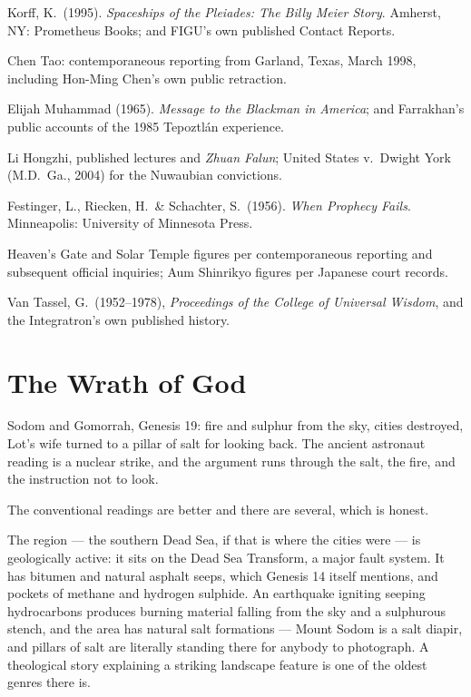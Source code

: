 \begin{srcnotes}
\item Korff, K.\ (1995). \emph{Spaceships of the Pleiades: The Billy Meier Story}. Amherst, NY:
Prometheus Books; and FIGU's own published Contact Reports.
\item Chen Tao: contemporaneous reporting from Garland, Texas, March 1998, including Hon-Ming
Chen's own public retraction.
\item Elijah Muhammad (1965). \emph{Message to the Blackman in America}; and Farrakhan's public
accounts of the 1985 Tepoztl\'an experience.
\item Li Hongzhi, published lectures and \emph{Zhuan Falun}; United States v.\ Dwight York (M.D.\
Ga., 2004) for the Nuwaubian convictions.
\item Festinger, L., Riecken, H.\ \& Schachter, S.\ (1956). \emph{When Prophecy Fails}.
Minneapolis: University of Minnesota Press.
\item Heaven's Gate and Solar Temple figures per contemporaneous reporting and subsequent
official inquiries; Aum Shinrikyo figures per Japanese court records.
\item Van Tassel, G.\ (1952--1978), \emph{Proceedings of the College of Universal Wisdom}, and
the Integratron's own published history.
\end{srcnotes}

\section{The Wrath of God}\label{sec:wrathgod}

Sodom and Gomorrah, Genesis 19: fire and sulphur from the sky, cities destroyed, Lot's wife
turned to a pillar of salt for looking back. The ancient astronaut reading is a nuclear strike,
and the argument runs through the salt, the fire, and the instruction not to look.

The conventional readings are better and there are several, which is honest.

The region --- the southern Dead Sea, if that is where the cities were --- is geologically
active: it sits on the Dead Sea Transform, a major fault system. It has bitumen and natural
asphalt seeps, which Genesis 14 itself mentions, and pockets of methane and hydrogen sulphide.
An earthquake igniting seeping hydrocarbons produces burning material falling from the sky and
a sulphurous stench, and the area has natural salt formations --- Mount Sodom is a salt diapir,
and pillars of salt are literally standing there for anybody to photograph. A theological story
explaining a striking landscape feature is one of the oldest genres there is.

